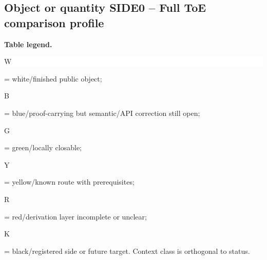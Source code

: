 \subsection*{Object or quantity SIDE0 -- Full ToE comparison profile}
\hypertarget{objproof:SIDE0}{}
\par\smallskip\noindent\begin{minipage}{0.99\linewidth}\footnotesize\raggedright\textbf{Table legend.} \colorbox{white}{\strut W} = white/finished public object; \colorbox{cyan!20}{\strut B} = blue/proof-carrying but semantic/API correction still open; \colorbox{green!18}{\strut G} = green/locally closable; \colorbox{yellow!25}{\strut Y} = yellow/known route with prerequisites; \colorbox{red!20}{\strut R} = red/derivation layer incomplete or unclear; \colorbox{black!18}{\strut K} = black/registered side or future target. Context class is orthogonal to status.\end{minipage}\par\vspace{0.25em}
